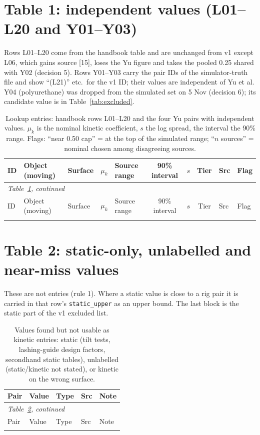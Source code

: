 \documentclass[11pt]{article}
\begin{document}
\section{Table 1: independent values (L01--L20 and Y01--Y03)}
Rows L01--L20 come from the handbook table and are unchanged from v1 except L06, which gains source [15], loses the Yu figure and takes the pooled 0.25 shared with Y02 (decision 5). Rows Y01--Y03 carry the pair IDs of the simulator-truth file and show ``(L21)'' etc.\ for the v1 ID; their values are independent of Yu et al. Y04 (polyurethane) was dropped from the simulated set on 5 Nov (decision 6); its candidate value is in Table~\ref{tab:excluded}.

{\footnotesize
\begin{longtable}{l p{2.8cm} p{2.2cm} r l c c c l l}
\caption{Lookup entries: handbook rows L01--L20 and the four Yu pairs with independent values. $\mu_k$ is the nominal kinetic coefficient, $s$ the log spread, the interval the 90\% range. Flags: ``near 0.50 cap'' = at the top of the simulated range; ``$n$ sources'' = nominal chosen among disagreeing sources.}\label{tab:main}\\
\hline
ID & Object (moving) & Surface & $\mu_k$ & Source range & 90\% interval & $s$ & Tier & Src & Flag\\
\hline
\endfirsthead
\multicolumn{10}{l}{\emph{Table~\ref{tab:main}, continued}}\\
\hline
ID & Object (moving) & Surface & $\mu_k$ & Source range & 90\% interval & $s$ & Tier & Src & Flag\\
\hline
\endhead
\hline
\endfoot

\end{longtable}
}

\section{Table 2: static-only, unlabelled and near-miss values}
These are not entries (rule 1). Where a static value is close to a rig pair it is carried in that row's \texttt{static\_upper} as an upper bound. The last block is the static part of the v1 excluded list.

{\footnotesize
\begin{longtable}{p{4.4cm} l l l p{6.2cm}}
\caption{Values found but not usable as kinetic entries: static (tilt tests, lashing-guide design factors, secondhand static tables), unlabelled (static/kinetic not stated), or kinetic on the wrong surface.}\label{tab:static}\\
\hline
Pair & Value & Type & Src & Note\\
\hline
\endfirsthead
\multicolumn{5}{l}{\emph{Table~\ref{tab:static}, continued}}\\
\hline
Pair & Value & Type & Src & Note\\
\hline
\endhead
\hline
\endfoot

\end{longtable}
}
\end{document}
